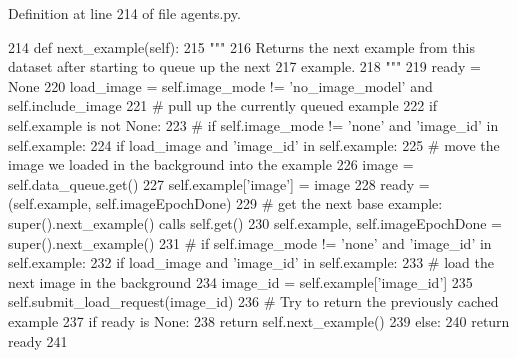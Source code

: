 Definition at line 214 of file agents.\+py.


\begin{DoxyCode}
214     \textcolor{keyword}{def }next\_example(self):
215         \textcolor{stringliteral}{"""}
216 \textcolor{stringliteral}{        Returns the next example from this dataset after starting to queue up the next}
217 \textcolor{stringliteral}{        example.}
218 \textcolor{stringliteral}{        """}
219         ready = \textcolor{keywordtype}{None}
220         load\_image = self.image\_mode != \textcolor{stringliteral}{'no\_image\_model'} \textcolor{keywordflow}{and} self.include\_image
221         \textcolor{comment}{# pull up the currently queued example}
222         \textcolor{keywordflow}{if} self.example \textcolor{keywordflow}{is} \textcolor{keywordflow}{not} \textcolor{keywordtype}{None}:
223             \textcolor{comment}{# if self.image\_mode != 'none' and 'image\_id' in self.example:}
224             \textcolor{keywordflow}{if} load\_image \textcolor{keywordflow}{and} \textcolor{stringliteral}{'image\_id'} \textcolor{keywordflow}{in} self.example:
225                 \textcolor{comment}{# move the image we loaded in the background into the example}
226                 image = self.data\_queue.get()
227                 self.example[\textcolor{stringliteral}{'image'}] = image
228             ready = (self.example, self.imageEpochDone)
229         \textcolor{comment}{# get the next base example: super().next\_example() calls self.get()}
230         self.example, self.imageEpochDone = super().next\_example()
231         \textcolor{comment}{# if self.image\_mode != 'none' and 'image\_id' in self.example:}
232         \textcolor{keywordflow}{if} load\_image \textcolor{keywordflow}{and} \textcolor{stringliteral}{'image\_id'} \textcolor{keywordflow}{in} self.example:
233             \textcolor{comment}{# load the next image in the background}
234             image\_id = self.example[\textcolor{stringliteral}{'image\_id'}]
235             self.submit\_load\_request(image\_id)
236         \textcolor{comment}{# Try to return the previously cached example}
237         \textcolor{keywordflow}{if} ready \textcolor{keywordflow}{is} \textcolor{keywordtype}{None}:
238             \textcolor{keywordflow}{return} self.next\_example()
239         \textcolor{keywordflow}{else}:
240             \textcolor{keywordflow}{return} ready
241 
\end{DoxyCode}
\mbox{\label{classparlai_1_1tasks_1_1image__chat_1_1agents_1_1ImageChatTeacher_ae37398f75ec883f5bbf276bf7b2cf715}} 
